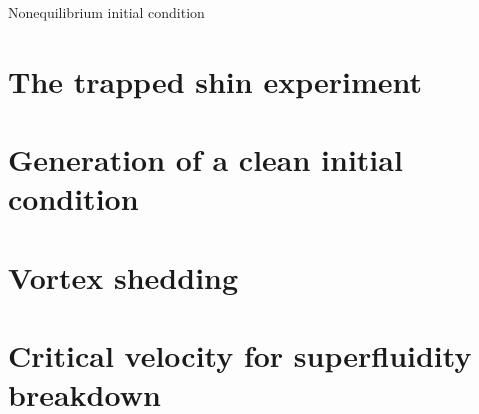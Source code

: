 \begin{chapter}{\label{cha:nonequib}Nonequilibrium initial condition}
\section{\label{section:nonequibexperiment} The trapped shin experiment}
\section{\label{section:cleanIC} Generation of a clean initial condition}
\section{\label{section:vortexshedding} Vortex shedding}
\section{\label{section:critvel} Critical velocity for superfluidity breakdown}
\end{chapter}
